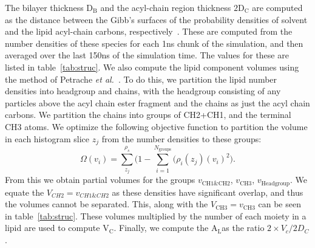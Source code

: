 \documentclass[journal=langd5,manuscript=article]{achemso}
\newcommand{\etal}{\textit{et al.}}
\newcommand{\db}{$\text{D}_\text{B}$}
\newcommand{\dc}{$\text{2D}_\text{C}$}
\newcommand{\Vc}{$\text{V}_\text{C}$}
\newcommand{\al}{$\text{A}_\text{L}$}
\begin{document}
The bilayer thickness \db{} and the acyl-chain region thickness \dc{} are computed as the distance between the Gibb's surfaces of the probability densities of solvent and the lipid acyl-chain carbons, respectively~\cite{fogarty:2015}. 
These are computed from the number densities of these species for each 1ns chunk of the simulation, and then averaged over the last 150ns of the simulation time.
The values for these are listed in table~\ref{tab:struc}. 
We also compute the lipid component volumes using the method of Petrache \etal{}~\cite{petrache:1997}. To do this, we partition the lipid number densities into 
headgroup and chains, with the headgroup consisting of any particles above the acyl chain ester fragment and the chains as just the acyl chain carbons. We partition the
chains into groups of CH2+CH1, and the terminal CH3 atoms. We optimize the following objective function to partition the volume in each histogram slice $z_j$ from the number densities to these groups:
\begin{equation}
    \Omega{(v_i)}=\sum^{\rho_s}_{z_j}\bigg(1-\sum^{N_{\text{groups}}}_{i=1}\big(\rho_i(z_j)(v_i)^2\bigg)\text{.}
\end{equation}
From this we obtain partial volumes for the groups $v_{\text{CH1\&CH2}}$, $v_{\text{CH3}}$, $v_{\text{Headgroup}}$. We equate the $V_{CH2}=v_{CH1\&CH2}$ as these densities have significant overlap, 
and thus the volumes cannot be separated. This, along with the $V_{\text{CH3}}=v_{\text{CH3}}$ can be seen in table~\ref{tab:struc}. These volumes multiplied by the number of each 
moiety in a lipid are used to compute \Vc. Finally, we compute the \al as the ratio $2\times{}V_c/2D_C$.
\end{document}
